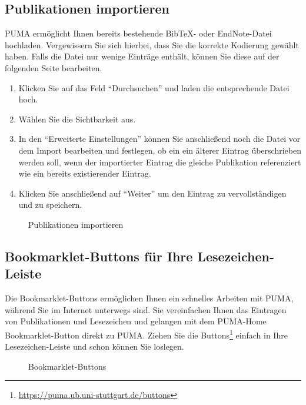 \subsection{Publikationen importieren}
PUMA ermöglicht Ihnen bereits bestehende BibTeX- oder EndNote-Datei hochladen. Vergewissern Sie sich hierbei, dass Sie die korrekte Kodierung gewählt haben. Falls die Datei nur wenige Einträge enthält, können Sie diese auf der folgenden Seite bearbeiten. 
\begin{enumerate}
	\item Klicken Sie auf das Feld \enquote{Durchsuchen} und laden die entsprechende Datei hoch. 
	\item Wählen Sie die Sichtbarkeit aus.
	\item In den \enquote{Erweiterte Einstellungen} können Sie anschließend noch die Datei vor dem Import bearbeiten und festlegen, ob ein ein älterer Eintrag überschrieben werden soll, wenn der importierter Eintrag die gleiche Publikation referenziert wie ein bereits existierender Eintrag.
	\item Klicken Sie anschließend auf \enquote{Weiter} um den Eintrag zu vervollständigen und zu speichern.
\end{enumerate}
\begin{figure}[h!]
 \centering
 \caption{Publikationen importieren}
 \label{figure3}
\end{figure}  



  
\subsection{Bookmarklet-Buttons für Ihre Lesezeichen-Leiste}
Die Bookmarklet-Buttons ermöglichen Ihnen ein schnelles Arbeiten mit PUMA, während Sie im Internet unterwegs sind. Sie vereinfachen Ihnen das Eintragen von Publikationen und Lesezeichen und gelangen mit dem PUMA-Home Bookmarklet-Button direkt zu PUMA. Ziehen Sie die Buttons\footnote{\url{https://puma.ub.uni-stuttgart.de/buttons}} einfach in Ihre Lesezeichen-Leiste und schon können Sie loslegen.
\begin{figure}[h!]
 \centering
 \caption{Bookmarklet-Buttons}
 \label{figure3}
\end{figure} 

